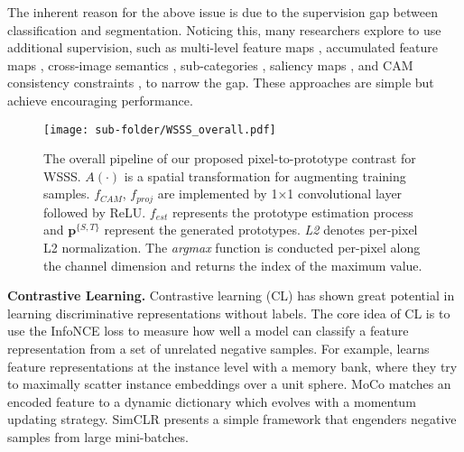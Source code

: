 \documentclass[10pt,twocolumn,letterpaper]{article}
\begin{document}
The inherent reason for the above issue is due to the supervision gap between classification and segmentation.
Noticing this, many researchers explore to use additional supervision, such as multi-level feature maps \cite{kim2016deconvolutionalmulti-feature}, accumulated feature maps \cite{jiang2019integralOAA}, cross-image semantics \cite{fan2020cianCIAN, sun2020miningcrossimage}, sub-categories \cite{chang2020weaklySubCategory}, saliency maps \cite{yao2020saliency2, lee2021railroadEPS}, and CAM consistency constraints \cite{wang2020selfSEAM}, to narrow the gap.
These approaches are simple but achieve encouraging performance.



\begin{figure*}[htp]
\centering
\begin{center}
\texttt{[image: sub-folder/WSSS\_overall.pdf]}
\end{center}
\caption{The overall pipeline of our proposed pixel-to-prototype contrast for WSSS. $A(\cdot)$ is a spatial transformation for augmenting training samples. $f_{CAM}$, $f_{proj}$ are implemented by 1×1 convolutional layer followed by ReLU. $f_{est}$ represents the prototype estimation process and $\boldsymbol{p}^{\{S,T\}}$ represent the generated prototypes. \textit{L2} denotes per-pixel L2 normalization. The \textit{argmax} function is conducted per-pixel along the channel dimension and returns the index of the maximum value.}
\label{overall}
\end{figure*}

\noindent \textbf{Contrastive Learning.}
Contrastive learning (CL) \cite{jaiswal2021CLsurvey1} has shown great potential in learning discriminative representations without labels.
The core idea of CL is to use the InfoNCE loss \cite{oord2018representationCPC_INFONCE} to measure how well a model can classify a feature representation from a set of unrelated negative samples.
For example, \cite{wu2018unsupervisedMemoryBank} learns feature representations at the instance level with a memory bank, where they try to maximally scatter instance embeddings over a unit sphere. 
MoCo \cite{he2020momentumMOCOv1} matches an encoded feature to a dynamic dictionary which evolves with a momentum updating strategy. 
SimCLR \cite{chen2020simpleSIMCLR} presents a simple framework that engenders negative samples from large mini-batches.
\end{document}
